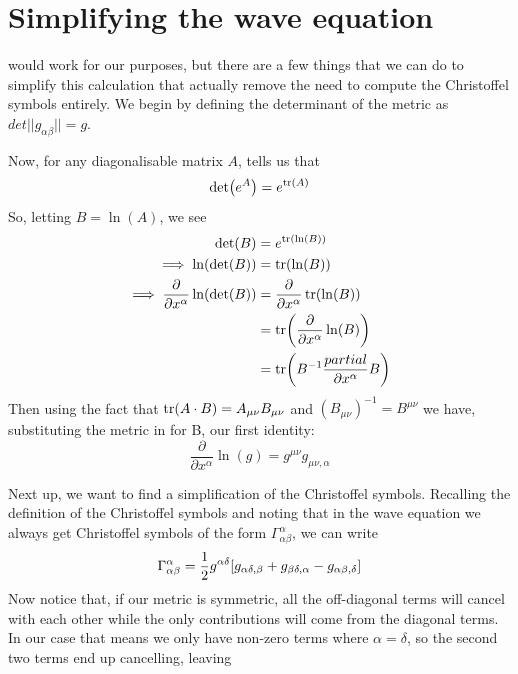 \documentclass[11pt]{article}
\numberwithin{equation}{section}
\numberwithin{figure}{section}
\numberwithin{table}{section}
\begin{document}
\section{Simplifying the wave equation}\label{sec:simplifying wave equation}
\par {} would work for our purposes, but there are a few things that we can do to simplify this calculation that actually remove the need to compute the Christoffel symbols entirely. We begin by defining the determinant of the metric as $det||g_{\alpha\beta}||=g$. 
\par Now, for any diagonalisable matrix $A$, \cite{determinant thm} tells us that 
\begin{equation}
    \det(e^{A})=e^{\tr(A)}
    \label{eqn:determinant theorem}
\end{equation}
So, letting $B=\ln(A)$, we see
\begin{align*}
    \det(B)&=e^{\tr(\ln(B))}\\
    \implies \ln(\det(B))&=\tr(\ln(B))\\
    \implies \frac{\partial}{\partial x^\alpha}\ln(\det(B))&=\frac{\partial}{\partial x^\alpha}\tr(\ln(B))\\
    &=\tr(\frac{\partial}{\partial x^\alpha}\ln(B))\\
    &=\tr(B^{-1}\frac{partial}{\partial x^\alpha}B)
\end{align*}
Then using the fact that $\tr(A\cdot B)=A_{\mu\nu}B_{\mu\nu}$ and $(B_{\mu\nu})^{-1}=B^{\mu\nu}$ we have, substituting the metric in for B, our first identity:
\begin{equation}
    \frac{\partial}{\partial x^\alpha}\ln(g)=g^{\mu\nu}g_{\mu\nu,\alpha}
    \label{eqn:identity 1}
\end{equation}
\par Next up, we want to find a simplification of the Christoffel symbols. Recalling the definition of the Christoffel symbols and noting that in the wave equation we always get Christoffel symbols of the form $\Gamma^\alpha_{\alpha\beta}$, we can write
\begin{equation*}
    \Gamma^\alpha_{\alpha\beta}=\frac{1}{2}g^{\alpha\delta}[g_{\alpha\delta,\beta}+g_{\beta\delta,\alpha}-g_{\alpha\beta,\delta}]\\
\end{equation*}
Now notice that, if our metric is symmetric, all the off-diagonal terms will cancel with each other while the only contributions will come from the diagonal terms. In our case that means we only have non-zero terms where $\alpha=\delta$, so the second two terms end up cancelling, leaving
\end{document}
